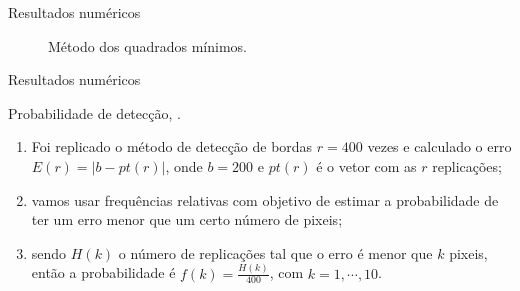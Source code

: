 \documentclass[10pt]{beamer}
\begin{document}
\begin{frame}{Resultados numéricos}
\begin{figure}[hbt]
\caption{Método dos quadrados mínimos.}
\endminipage\hfill
\end{figure}
\end{frame}
\begin{frame}{Resultados numéricos}
\begin{alertblock}{Probabilidade de detecção, \cite{gmbf}.}
\begin{enumerate}
    \item Foi replicado o método de detecção de bordas $r=400$ vezes e calculado o erro $E(r)=|b - pt(r)|$, onde $b=200$ e $pt(r)$ é o vetor com as $r$ replicações;
    \item vamos usar frequências relativas com objetivo de estimar a probabilidade de ter um erro menor que um certo número de pixeis;
    \item sendo $H(k)$ o número de replicações tal que o erro é menor que $k$ pixeis, então a probabilidade é $f(k)=\frac{H(k)}{400}$, com $k=1,\cdots,10$. 
\end{enumerate}
\end{alertblock}
\end{frame}
\end{document}
